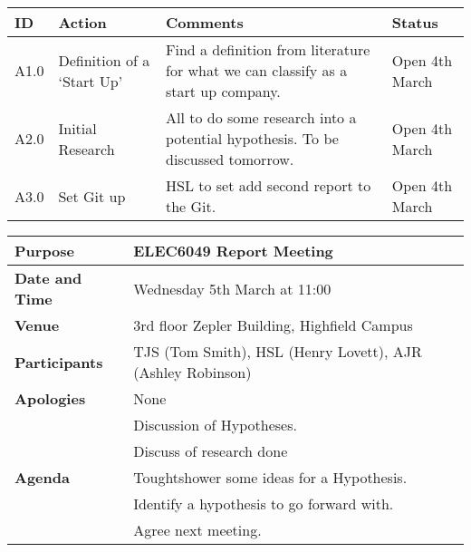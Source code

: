 \begin{center}
\begin{longtable}{| p{} | >{\raggedright\arraybackslash}p{} |  p{} | >{\raggedright\arraybackslash}p{}|} \hline
\textbf{ID} & \textbf{Action} & \textbf{Comments} & \textbf{Status} \\ \hline
\endhead
A1.0	&	Definition of a `Start Up'	&	Find a definition from literature for what we can classify as a start up company.	& Open 4th March \\ \hline
A2.0	&	Initial Research	&	All to do some research into a potential hypothesis. To be discussed tomorrow.	&	Open 4th March \\ \hline
A3.0	&	Set Git up	&	HSL to set add second report to the Git.	&	Open 4th March	\\ \hline	
\end{longtable}
\end{center}



{}
\begin{center}
\begin{longtable}{| m{} | m{} |} \hline
\textbf{Purpose} & ELEC6049 Report Meeting \\ \hline
\textbf{Date and Time} & Wednesday 5th March at 11:00 \\ \hline
\textbf{Venue} & 3rd floor Zepler Building, Highfield Campus \\ \hline
\textbf{Participants} & TJS (Tom Smith), HSL (Henry Lovett), AJR (Ashley Robinson)\\ \hline
\textbf{Apologies} & None \\ \hline
\multirow{5}{*}{\textbf{Agenda}} & Discussion of Hypotheses. \\
 & Discuss of research done \\ 
 & Toughtshower some ideas for a Hypothesis. \\
 & Identify a hypothesis to go forward with. \\ 
 & Agree next meeting. \\ \hline
\end{longtable}
\end{center}

